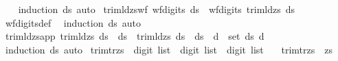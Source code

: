 \begin{isabellebody}
%
\isadelimproof
\ \ %
\endisadelimproof
%
\isatagproof
{}\isamarkupfalse%
\ {\isacharparenleft}{\kern0pt}induction\ ds{\isacharparenright}{\kern0pt}\ auto%
\endisatagproof
{\isafoldproof}%
%
\isadelimproof
\isanewline
%
\endisadelimproof
\isanewline
{}\isamarkupfalse%
\ trim{\isacharunderscore}{\kern0pt}ld{\isacharunderscore}{\kern0pt}zs{\isacharunderscore}{\kern0pt}wf{\isacharcolon}{\kern0pt}\ {\isachardoublequoteopen}wf{\isacharunderscore}{\kern0pt}digits\ ds\ {\isasymLongrightarrow}\ wf{\isacharunderscore}{\kern0pt}digits\ {\isacharparenleft}{\kern0pt}trim{\isacharunderscore}{\kern0pt}ld{\isacharunderscore}{\kern0pt}zs\ ds{\isacharparenright}{\kern0pt}{\isachardoublequoteclose}\isanewline
%
\isadelimproof
\ \ %
\endisadelimproof
%
\isatagproof
{}\isamarkupfalse%
\ wf{\isacharunderscore}{\kern0pt}digits{\isacharunderscore}{\kern0pt}def\ \isamarkupfalse%
\ {\isacharparenleft}{\kern0pt}induction\ ds{\isacharparenright}{\kern0pt}\ auto%
\endisatagproof
{\isafoldproof}%
%
\isadelimproof
\isanewline
%
\endisadelimproof
\isanewline
{}\isamarkupfalse%
\ trim{\isacharunderscore}{\kern0pt}ld{\isacharunderscore}{\kern0pt}zs{\isacharunderscore}{\kern0pt}app{\isacharcolon}{\kern0pt}\ {\isachardoublequoteopen}trim{\isacharunderscore}{\kern0pt}ld{\isacharunderscore}{\kern0pt}zs\ {\isacharparenleft}{\kern0pt}ds{}\ {\isacharat}{\kern0pt}\ ds{}{\isacharparenright}{\kern0pt}\ {\isacharequal}{\kern0pt}\ {\isacharparenleft}{\kern0pt}trim{\isacharunderscore}{\kern0pt}ld{\isacharunderscore}{\kern0pt}zs\ ds{}{\isacharparenright}{\kern0pt}\ {\isacharat}{\kern0pt}\ ds{}\ {\isasymor}\ {\isacharparenleft}{\kern0pt}{\isasymforall}d\ {\isasymin}\ set\ ds{}{\isachardot}{\kern0pt}\ d\ {\isacharequal}{\kern0pt}\ {}{\isacharparenright}{\kern0pt}{\isachardoublequoteclose}\isanewline
%
\isadelimproof
\ \ %
\endisadelimproof
%
\isatagproof
{}\isamarkupfalse%
\ {\isacharparenleft}{\kern0pt}induction\ ds{}{\isacharparenright}{\kern0pt}\ auto%
\endisatagproof
{\isafoldproof}%
%
\isadelimproof
\isanewline
%
\endisadelimproof
\isanewline
{}\isamarkupfalse%
\ trim{\isacharunderscore}{\kern0pt}tr{\isacharunderscore}{\kern0pt}zs{\isacharprime}{\kern0pt}\ {\isacharcolon}{\kern0pt}{\isacharcolon}{\kern0pt}\ {\isachardoublequoteopen}digit\ list\ {\isasymRightarrow}\ digit\ list\ {\isasymRightarrow}\ digit\ list{\isachardoublequoteclose}\ \isanewline
\ \ {\isachardoublequoteopen}trim{\isacharunderscore}{\kern0pt}tr{\isacharunderscore}{\kern0pt}zs{\isacharprime}{\kern0pt}\ {\isacharbrackleft}{\kern0pt}{\isacharbrackright}{\kern0pt}\ zs\ {\isacharequal}{\kern0pt}\ {\isacharbrackleft}{\kern0pt}{\isacharbrackright}{\kern0pt}{\isachardoublequoteclose}\isanewline

\end{isabellebody}
